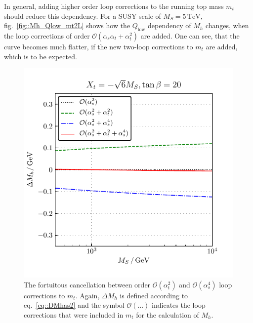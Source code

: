\documentclass[a4paper,12pt]{book}
\begin{document}
In general, adding higher order loop corrections to the running top mass $m_t$ should reduce this dependency. For a SUSY scale of $M_S=5\,\mathrm{TeV}$, fig.\ \ref{fig::Mh_Qlow_mt2L} shows how the $Q_\text{low}$ dependency of $M_h$ changes, when the loop corrections of order $\mathcal{O}(\alpha_s\alpha_t+\alpha_t^2)$ are added. One can see, that the curve becomes much flatter, if the new two-loop corrections to $m_t$ are added, which is to be expected.\par
\begin{figure}[h]
\begin{minipage}[t]{0.5\textwidth}
\includegraphics[width=\textwidth]{src/img/DMh_MS_mtat2_mtas4.pdf}
\captionsetup{width=.8\textwidth}
\caption{The fortuitous cancellation between order $\mathcal{O}(\alpha_t^2)$ and $\mathcal{O}(\alpha_s^4)$ loop corrections to $m_t$. Again, $\Delta M_h$ is defined according to eq.\ \eqref{eq::DMhas2} and the symbol $\mathcal{O}(...)$ indicates the loop corrections that were included in $m_t$ for the calculation of $M_h$.}
\label{fig::DMh_cancellation}
\end{minipage}
\begin{minipage}[t]{0.5\textwidth}

\end{minipage}
\end{figure}
\end{document}
